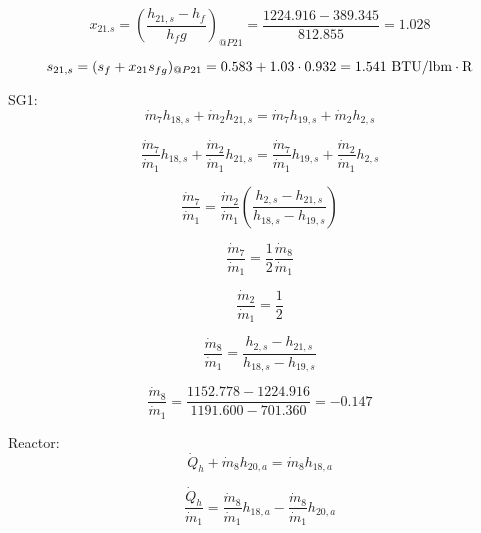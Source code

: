 \documentclass{article}
\begin{document}
\begin{equation}
x_{21.s} = (\frac{h_{21,s} - h_{f}}{h_fg})_{@P21} = \frac{1224.916 -  389.345}{ 812.855} =    1.028
\end{equation}

\begin{equation}
  s_{21,s} = (s_{f} + x_{21}s_{fg})_{@P21} =    0.583 + 1.03\cdot   0.932 =    1.541
\textnormal{ BTU/lbm}\cdot\textnormal{R}
\end{equation}


SG1: 
\begin{equation}
\dot{m}_{ 7}h_{18,s} + \dot{m}_{ 2}h_{21,s} = \dot{m}_{ 7}h_{19,s} + \dot{m}_{ 2}h_{ 2,s}
\end{equation}

\begin{equation}
\frac{\dot{m}_{ 7}}{\dot{m}_{ 1}}h_{18,s} + \frac{\dot{m}_{ 2}}{\dot{m}_{ 1}}h_{21,s} = \frac{\dot{m}_{ 7}}{\dot{m}_{ 1}}h_{19,s} + \frac{\dot{m}_{ 2}}{\dot{m}_{ 1}}h_{ 2,s}
\end{equation}

\begin{equation}
\frac{\dot{m}_{ 7}}{\dot{m}_{ 1}} =  \frac{\dot{m}_{ 2}}{\dot{m}_{ 1}}(\frac{h_{ 2,s} - h_{21,s}}{h_{18,s} - h_{19,s}})
\end{equation}

\begin{equation}
\frac{\dot{m}_{ 7}}{\dot{m}_{ 1}} = \frac{1}{2}\frac{\dot{m}_{ 8}}{\dot{m}_{ 1}} 
\end{equation}

\begin{equation}
\frac{\dot{m}_{ 2}}{\dot{m}_{1}} = \frac{1}{2}
\end{equation}

\begin{equation}
\frac{\dot{m}_{ 8}}{\dot{m}_{ 1}} = \frac{h_{ 2,s} - h_{21,s}}{h_{18,s} - h_{19,s}}
\end{equation}

\begin{equation}
\frac{\dot{m}_{ 8}}{\dot{m}_{ 1}} = \frac{1152.778 - 1224.916}{1191.600 -  701.360} =   -0.147
\end{equation}


Reactor:
\begin{equation}
\dot{Q}_{h} + \dot{m}_{ 8}h_{20,a} = \dot{m}_{ 8}h_{18,a}\end{equation}

\begin{equation}
\frac{\dot{Q}_{h}}{\dot{m}_{1}} = \frac{\dot{m}_{ 8}}{\dot{m}_{ 1}}h_{18,a} - \frac{\dot{m}_{ 8}}{\dot{m}_{ 1}}h_{20,a}\end{equation}
\end{document}
